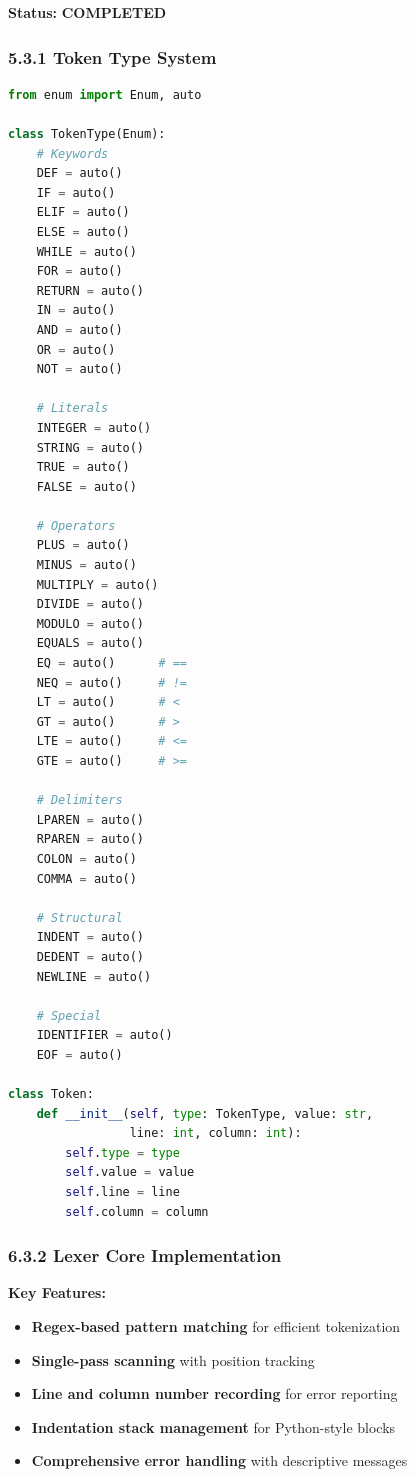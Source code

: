 \documentclass[a4paper,11pt]{article}
\newcommand{\statusgood}[1]{\colorbox{green!20}{\textbf{#1}}}
\begin{document}
\textbf{Status:} \statusgood{COMPLETED}

\subsubsection{5.3.1 Token Type System}

\begin{lstlisting}[language=Python, caption=Token Definition]
from enum import Enum, auto

class TokenType(Enum):
    # Keywords
    DEF = auto()
    IF = auto()
    ELIF = auto()
    ELSE = auto()
    WHILE = auto()
    FOR = auto()
    RETURN = auto()
    IN = auto()
    AND = auto()
    OR = auto()
    NOT = auto()
    
    # Literals
    INTEGER = auto()
    STRING = auto()
    TRUE = auto()
    FALSE = auto()
    
    # Operators
    PLUS = auto()
    MINUS = auto()
    MULTIPLY = auto()
    DIVIDE = auto()
    MODULO = auto()
    EQUALS = auto()
    EQ = auto()      # ==
    NEQ = auto()     # !=
    LT = auto()      # <
    GT = auto()      # >
    LTE = auto()     # <=
    GTE = auto()     # >=
    
    # Delimiters
    LPAREN = auto()
    RPAREN = auto()
    COLON = auto()
    COMMA = auto()
    
    # Structural
    INDENT = auto()
    DEDENT = auto()
    NEWLINE = auto()
    
    # Special
    IDENTIFIER = auto()
    EOF = auto()
    
class Token:
    def __init__(self, type: TokenType, value: str, 
                 line: int, column: int):
        self.type = type
        self.value = value
        self.line = line
        self.column = column
\end{lstlisting}

\subsubsection{6.3.2 Lexer Core Implementation}

\textbf{Key Features:}
\begin{itemize}[leftmargin=*]
    \item \textbf{Regex-based pattern matching} for efficient tokenization
    \item \textbf{Single-pass scanning} with position tracking
    \item \textbf{Line and column number recording} for error reporting
    \item \textbf{Indentation stack management} for Python-style blocks
    \item \textbf{Comprehensive error handling} with descriptive messages
\end{itemize}
\end{document}
